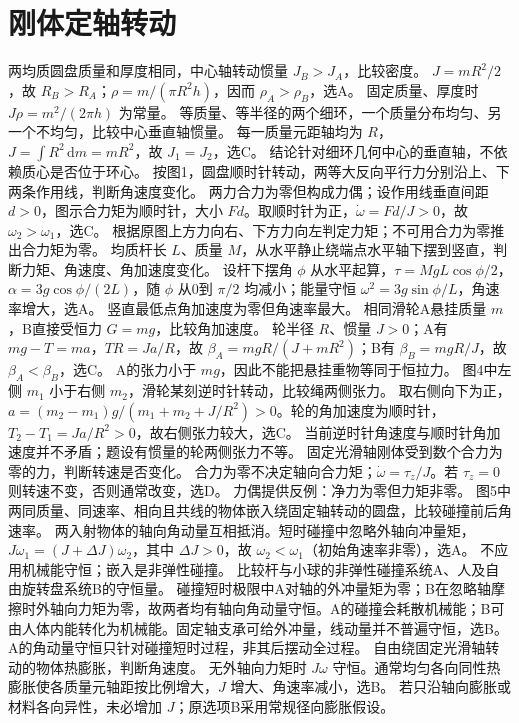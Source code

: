 \section{刚体定轴转动}
\problemtext 两均质圆盘质量和厚度相同，中心轴转动惯量 $J_B>J_A$，比较密度。
\workings $J=mR^2/2$，故 $R_B>R_A$；$\rho=m/(\pi R^2h)$，因而 $\rho_A>\rho_B$，选A。
\crosscheck 固定质量、厚度时 $J\rho=m^2/(2\pi h)$ 为常量。
\problemtext 等质量、等半径的两个细环，一个质量分布均匀、另一个不均匀，比较中心垂直轴惯量。
\workings 每一质量元距轴均为 $R$，$J=\int R^2\,\mathrm dm=mR^2$，故 $J_1=J_2$，选C。
\crosscheck 结论针对细环几何中心的垂直轴，不依赖质心是否位于环心。
\problemtext 按图1，圆盘顺时针转动，两等大反向平行力分别沿上、下两条作用线，判断角速度变化。
\workings 两力合力为零但构成力偶；设作用线垂直间距 $d>0$，图示合力矩为顺时针，大小 $Fd$。取顺时针为正，$\dot\omega=Fd/J>0$，故 $\omega_2>\omega_1$，选C。
\crosscheck 根据原图上方力向右、下方力向左判定力矩；不可用合力为零推出合力矩为零。
\problemtext 均质杆长 $L$、质量 $M$，从水平静止绕端点水平轴下摆到竖直，判断力矩、角速度、角加速度变化。
\workings 设杆下摆角 $\phi$ 从水平起算，$\tau=MgL\cos\phi/2$，$\alpha=3g\cos\phi/(2L)$，随 $\phi$ 从0到 $\pi/2$ 均减小；能量守恒 $\omega^2=3g\sin\phi/L$，角速率增大，选A。
\crosscheck 竖直最低点角加速度为零但角速率最大。
\problemtext 相同滑轮A悬挂质量 $m$，B直接受恒力 $G=mg$，比较角加速度。
\workings 轮半径 $R$、惯量 $J>0$；A有 $mg-T=ma$，$TR=J a/R$，故 $\beta_A=mgR/(J+mR^2)$；B有 $\beta_B=mgR/J$，故 $\beta_A<\beta_B$，选C。
\crosscheck A的张力小于 $mg$，因此不能把悬挂重物等同于恒拉力。
\problemtext 图4中左侧 $m_1$ 小于右侧 $m_2$，滑轮某刻逆时针转动，比较绳两侧张力。
\workings 取右侧向下为正，$a=(m_2-m_1)g/(m_1+m_2+J/R^2)>0$。轮的角加速度为顺时针，$T_2-T_1=Ja/R^2>0$，故右侧张力较大，选C。
\crosscheck 当前逆时针角速度与顺时针角加速度并不矛盾；题设有惯量的轮两侧张力不等。
\problemtext 固定光滑轴刚体受到数个合力为零的力，判断转速是否变化。
\workings 合力为零不决定轴向合力矩；$\dot\omega=\tau_z/J$。若 $\tau_z=0$ 则转速不变，否则通常改变，选D。
\crosscheck 力偶提供反例：净力为零但力矩非零。
\problemtext 图5中两同质量、同速率、相向且共线的物体嵌入绕固定轴转动的圆盘，比较碰撞前后角速率。
\workings 两入射物体的轴向角动量互相抵消。短时碰撞中忽略外轴向冲量矩，$J\omega_1=(J+\Delta J)\omega_2$，其中 $\Delta J>0$，故 $\omega_2<\omega_1$（初始角速率非零），选A。
\crosscheck 不应用机械能守恒；嵌入是非弹性碰撞。
\problemtext 比较杆与小球的非弹性碰撞系统A、人及自由旋转盘系统B的守恒量。
\workings 碰撞短时极限中A对轴的外冲量矩为零；B在忽略轴摩擦时外轴向力矩为零，故两者均有轴向角动量守恒。A的碰撞会耗散机械能；B可由人体内能转化为机械能。固定轴支承可给外冲量，线动量并不普遍守恒，选B。
\crosscheck A的角动量守恒只针对碰撞短时过程，非其后摆动全过程。
\problemtext 自由绕固定光滑轴转动的物体热膨胀，判断角速度。
\workings 无外轴向力矩时 $J\omega$ 守恒。通常均匀各向同性热膨胀使各质量元轴距按比例增大，$J$ 增大、角速率减小，选B。
\crosscheck 若只沿轴向膨胀或材料各向异性，未必增加 $J$；原选项B采用常规径向膨胀假设。

